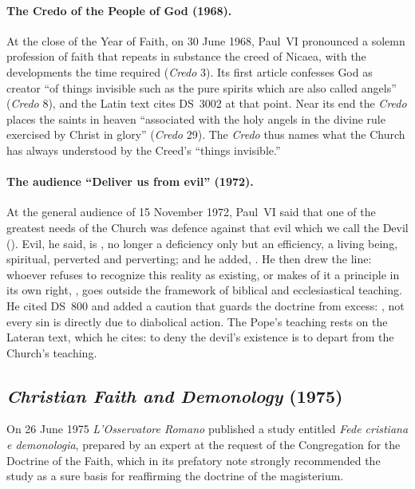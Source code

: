 \paragraph{The Credo of the People of God (1968).} At the close of the Year
of Faith, on 30 June 1968, Paul~VI pronounced a solemn profession of faith
that repeats in substance the creed of Nicaea, with the developments the
time required (\emph{Credo} 3). Its first article confesses God as creator ``of
things invisible such as the pure spirits which are also called angels''
(\emph{Credo} 8), and the Latin text cites DS~3002 at that point. Near its
end the \emph{Credo} places the saints in heaven ``associated with the holy
angels in the divine rule exercised by Christ in glory'' (\emph{Credo} 29).
The \emph{Credo} thus names what the Church has always understood by the
Creed's ``things invisible.''

\paragraph{The audience ``Deliver us from evil'' (1972).} At the general
audience of 15 November 1972, Paul~VI said that one of the greatest needs of
the Church was defence against that evil which we call the Devil (). Evil, he said, is
, no longer a deficiency only but an
efficiency, a living being, spiritual, perverted and perverting; and he
added, . He then drew the
line: whoever refuses to recognize this reality as existing, or makes of it
a principle in its own right, , goes outside the framework of biblical and
ecclesiastical teaching. He cited DS~800 and added a caution that guards
the doctrine from excess: , not every sin is directly due to
diabolical action. The Pope's teaching
rests on the Lateran text, which he cites: to deny the devil's existence is
to depart from the Church's teaching.

\sectionguard
\subsection{\emph{Christian Faith and Demonology} (1975)}

On 26 June 1975 \emph{L'Osservatore Romano} published a study entitled
\emph{Fede cristiana e demonologia}, prepared by an expert at the request
of the Congregation for the Doctrine of the Faith, which in its prefatory
note strongly recommended the study as a sure basis for reaffirming the
doctrine of the magisterium.

